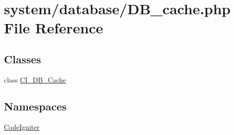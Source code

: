 \hypertarget{_d_b__cache_8php}{}\section{system/database/\+D\+B\+\_\+cache.php File Reference}
\label{_d_b__cache_8php}
\subsection*{Classes}
\begin{DoxyCompactItemize}
\item 
class \mbox{\hyperlink{class_c_i___d_b___cache}{C\+I\+\_\+\+D\+B\+\_\+\+Cache}}
\end{DoxyCompactItemize}
\subsection*{Namespaces}
\begin{DoxyCompactItemize}
\item 
 \mbox{\hyperlink{namespace_code_igniter}{Code\+Igniter}}
\end{DoxyCompactItemize}
